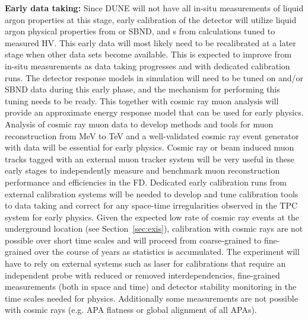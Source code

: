 \textbf{Early data taking:} Since DUNE will not have all in-situ measurements of liquid argon properties at this stage, early calibration of the detector will utilize liquid argon physical properties from  or SBND, and \efield{}s from calculations tuned to measured HV. This early data will most likely need to be recalibrated at a later stage when other data sets become available. This is expected to improve from in-situ measurements as data taking progresses and with dedicated calibration runs. The detector response models in simulation will need to be tuned on  and\slash or SBND data during this early phase, and the mechanism for performing this tuning needs to be ready. This together with cosmic ray muon analysis will provide an approximate energy response model that can be used for early physics. Analysis of cosmic ray muon data to develop methods and tools for muon reconstruction from MeV to TeV and a well-validated cosmic ray event generator with data will be essential for early physics. Cosmic ray or beam induced muon tracks tagged with an external muon tracker system will be very useful in these early stages to independently measure and benchmark muon reconstruction performance and efficiencies in the FD. Dedicated early calibration runs from external calibration systems will be needed to develop and tune calibration tools to data taking and correct for any space-time irregularities observed in the TPC system for early physics. Given the expected low rate of cosmic ray events at the underground location (see Section~\ref{sec:exis}), calibration with cosmic rays are not possible over short time scales and will proceed from coarse-grained to fine-grained over the course of years as statistics is accumulated. The experiment will have to rely on external systems such as laser for calibrations that require an independent probe with reduced or removed interdependencies, fine-grained measurements (both in space and time) and detector stability monitoring in the time scales needed for physics. Additionally some measurements are not possible with cosmic rays (e.g. APA flatness or global alignment of all APAs). 

